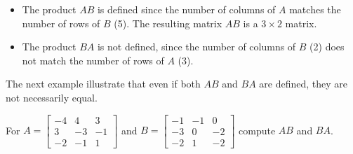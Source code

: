 \begin{solution}
    \begin{itemize}
        \item The product $A B$ is defined since the number of columns of $A$ matches the number of rows of $B$ (5). The resulting matrix $A B$ is a $3 \times 2$ matrix.
        \item The product $B A$ is not defined, since the number of columns of $B$ (2) does not match the number of rows of $A$ (3).
    \end{itemize}
\end{solution}

The next example illustrate that even if both $AB$ and $BA$ are defined, they are not necessarily equal.

\begin{example}
    For $A = \left[\begin{array}{rrr}
        -4 & 4 & 3 \\
        3 & -3 & -1 \\
        -2 & -1 & 1
        \end{array}\right] $ and $B = \left[\begin{array}{rrr}
            -1 & -1 & 0 \\
            -3 & 0 & -2 \\
            -2 & 1 & -2
            \end{array}\right]$ compute $AB$ and $BA$.

\end{example}

